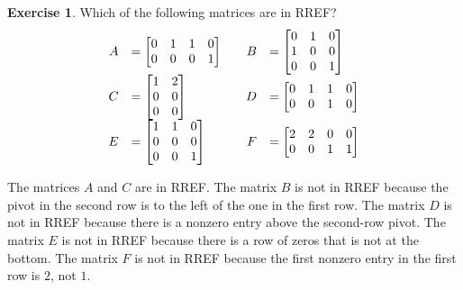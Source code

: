 \documentclass[a4paper]{book}
\theoremstyle{definition}
\newtheorem{exercise}[theorem]{Exercise}
\renewenvironment{solution}{\SolutionInline}{\endSolutionInline}
\begin{document}
\begin{exercise}
 Which of the following matrices are in RREF?
 {\small \[ \begin{array}{rlcrl}
  A &= \begin{bmatrix} 0&1&1&0 \\ 0&0&0&1 \end{bmatrix} &&
  B &= \begin{bmatrix} 0&1&0 \\ 1&0&0 \\ 0&0&1 \end{bmatrix} \\
  C &= \begin{bmatrix} 1&2\\0&0\\0&0 \end{bmatrix} &&
  D &= \begin{bmatrix} 0&1&1&0\\0&0&1&0 \end{bmatrix} \\
  E &= \begin{bmatrix} 1&1&0\\0&0&0\\0&0&1 \end{bmatrix} &&
  F &= \begin{bmatrix} 2&2&0&0 \\ 0&0&1&1 \end{bmatrix} 
 \end{array} \] }
\end{exercise}
\begin{solution}
 The matrices $A$ and $C$ are in RREF.  The matrix $B$ is not in RREF
 because the pivot in the second row is to the left of the one in the
 first row.  The matrix $D$ is not in RREF because there is a nonzero
 entry above the second-row pivot.  The matrix $E$ is not in RREF
 because there is a row of zeros that is not at the bottom.  The
 matrix $F$ is not in RREF because the first nonzero entry in the
 first row is $2$, not $1$. 
\end{solution}
\end{document}
